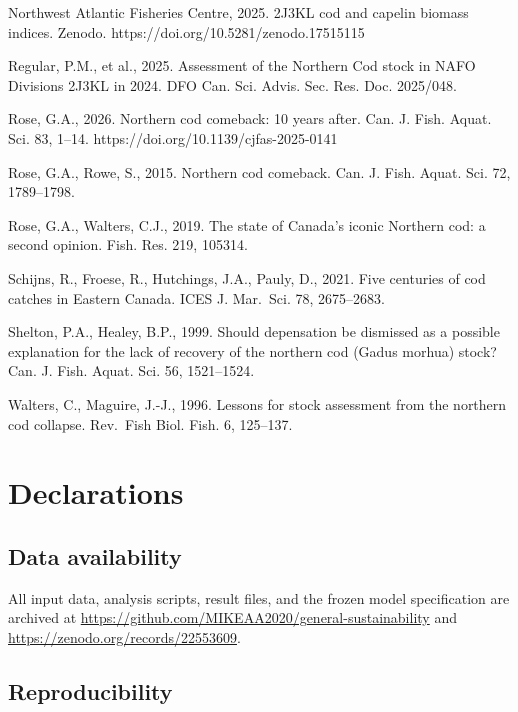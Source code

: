 \documentclass[11pt]{article}
\begin{document}
Northwest Atlantic Fisheries Centre, 2025. 2J3KL cod and capelin biomass
indices. Zenodo. https://doi.org/10.5281/zenodo.17515115

Regular, P.M., et al., 2025. Assessment of the Northern Cod stock in
NAFO Divisions 2J3KL in 2024. DFO Can. Sci. Advis. Sec. Res. Doc.
2025/048.

Rose, G.A., 2026. Northern cod comeback: 10 years after. Can. J. Fish.
Aquat. Sci. 83, 1--14. https://doi.org/10.1139/cjfas-2025-0141

Rose, G.A., Rowe, S., 2015. Northern cod comeback. Can. J. Fish. Aquat.
Sci. 72, 1789--1798.

Rose, G.A., Walters, C.J., 2019. The state of Canada's iconic Northern
cod: a second opinion. Fish. Res. 219, 105314.

Schijns, R., Froese, R., Hutchings, J.A., Pauly, D., 2021. Five
centuries of cod catches in Eastern Canada. ICES J. Mar.~Sci. 78,
2675--2683.

Shelton, P.A., Healey, B.P., 1999. Should depensation be dismissed as a
possible explanation for the lack of recovery of the northern cod (Gadus
morhua) stock? Can. J. Fish. Aquat. Sci. 56, 1521--1524.

Walters, C., Maguire, J.-J., 1996. Lessons for stock assessment from the
northern cod collapse. Rev.~Fish Biol. Fish. 6, 125--137.

\section*{Declarations}

\subsection*{Data availability}

All input data, analysis scripts, result files, and the frozen model
specification are archived at
\url{https://github.com/MIKEAA2020/general-sustainability} and
\url{https://zenodo.org/records/22553609}.

\subsection*{Reproducibility}
\end{document}
